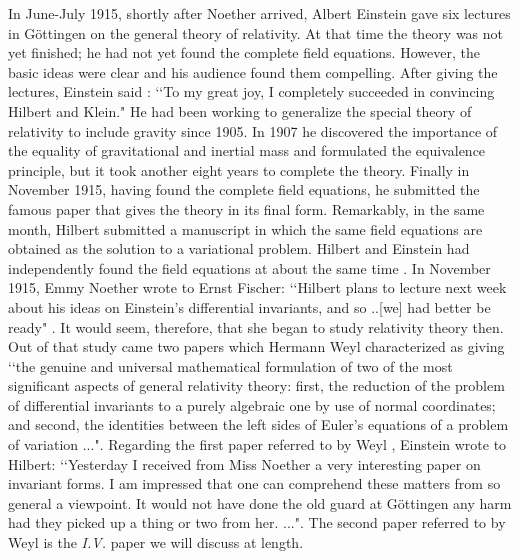 \documentclass[12pt]{article}
\begin{document}
In June-July 1915,
shortly after Noether arrived,  Albert Einstein gave  six 
lectures in G\"{o}ttingen on the general  theory of relativity.   At that time the theory  was
not yet finished; he had not yet found the complete field equations. However,
the basic ideas were clear and his audience found them  compelling.  
After giving the lectures, Einstein said \cite{pais}: \lq\lq To my great joy, I completely 
succeeded in convincing Hilbert and Klein." He had been working to generalize
the special theory of relativity to include gravity since 1905. In 1907 he
discovered the importance  of the equality of gravitational and inertial mass
and formulated the equivalence principle, but it took another eight years  to
complete the theory.  Finally in November 1915, having found the complete field
equations, he submitted   the famous paper \cite{einstein} that gives the theory
in its final form. Remarkably, in the same month,  Hilbert
submitted a manuscript \cite{hilbert} in which the same field  equations are
obtained as the solution to a variational problem. Hilbert and
Einstein  had independently found the field equations at about the same
time \cite{pais}.  
In  November 1915, Emmy Noether  wrote to Ernst Fischer:
\lq\lq Hilbert plans to lecture next week about his ideas on Einstein's
differential invariants, and so ..[we] had better be ready" \cite{Dick}.  It would
seem, therefore, that she 
 began to study relativity theory then.  Out of that
study came two papers which Hermann Weyl characterized as giving \lq\lq the
genuine and universal mathematical formulation of two of  the most significant
aspects of general relativity theory: first, the reduction of the problem of
differential invariants to a purely algebraic one by use of normal coordinates;
and second, the identities between the left sides of Euler's equations of a
problem of variation ..."\cite{weyl}.  Regarding the first paper 
referred to by Weyl 
\cite{paper1}, Einstein wrote to Hilbert: \lq\lq Yesterday I  received from Miss
Noether a very interesting paper on invariant forms. I am impressed that one
can comprehend these matters from so general a viewpoint. It would not have
done the old guard at G\"{o}ttingen any harm had they picked up a thing or two
from her. ..."\cite{kimb}. The second paper referred to by Weyl
  is the {\it{I.V.}} paper we will discuss at length.
\end{document}
